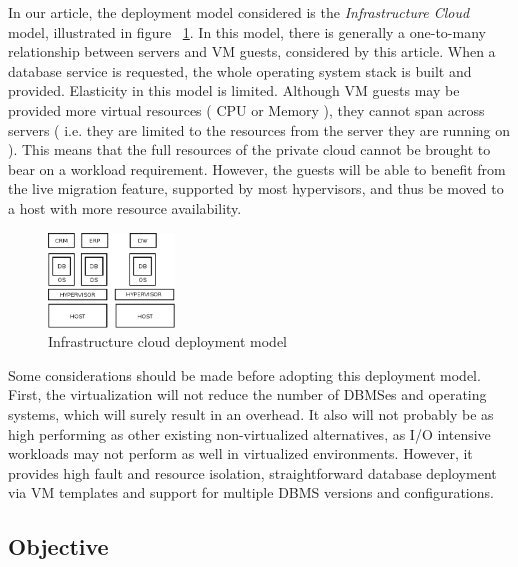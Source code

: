 \documentclass[jidm,a4paper]{jidm} %
\begin{document}
In our article, the deployment model considered is the \textit{Infrastructure Cloud} model, illustrated in figure  ~\ref{fig:infra-model}. In this model, there is generally a one-to-many relationship between servers and VM guests, considered by this article. When a database service is requested, the whole operating system stack is built and provided. Elasticity in this model is limited. Although VM guests may be provided more virtual resources ( CPU or Memory ), they cannot span across servers ( i.e. they are limited to the resources from the server they are running on ). This means that the full resources of the private cloud cannot be brought to bear on a workload requirement. However, the guests will be able to benefit from the live migration feature, supported by most hypervisors, and thus be moved to a host with more resource availability. 

\begin{figure}[t]
\centering
\includegraphics[width=0.3\textwidth]{infra-model.eps}
\caption{Infrastructure cloud deployment model}
\label{fig:infra-model}
\end{figure} 

Some considerations should be made before adopting this deployment model. First, the virtualization will not reduce the number of DBMSes and operating systems, which will surely result in an overhead. It also will not probably be as high performing as other existing non-virtualized alternatives, as I/O intensive workloads may not perform as well in virtualized environments. However, it provides high fault and resource isolation, straightforward database deployment via VM templates and  support for multiple DBMS versions and configurations.


\subsection{Objective}
\end{document}
